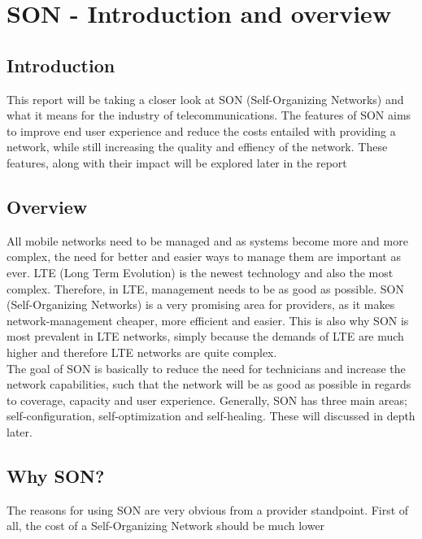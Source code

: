 \documentclass{report}
\begin{document}
\newpage
\tableofcontents
\newpage


\chapter{SON - Introduction and overview}
\section{Introduction}
This report will be taking a closer look at SON (Self-Organizing Networks) and what it means for the industry of telecommunications. 
The features of SON aims to improve end user experience and reduce the costs entailed with providing a network, while still increasing the quality and effiency of the network. 
These features, along with their impact will be explored later in the report 

\section{Overview}
All mobile networks need to be managed and as systems become more and more complex, the need for better and easier ways to manage them are important as ever. LTE (Long Term Evolution) is the newest technology and also the most complex. Therefore, in LTE, management needs to be as good as possible. SON (Self-Organizing Networks) is a very promising area for providers, as it makes network-management cheaper, more efficient and easier. This is also why SON is most prevalent in LTE networks, simply because the demands of LTE are much higher and therefore LTE networks are quite complex.\\

The goal of SON is basically to reduce the need for technicians and increase the network capabilities, such that the network will be as good as possible in regards to coverage, capacity and user experience. Generally, SON has three main areas; self-configuration, self-optimization and self-healing. These will discussed in depth later. 

\section{Why SON?}
The reasons for using SON are very obvious from a provider standpoint. First of all, the cost of a Self-Organizing Network should be much lower 
\end{document}
